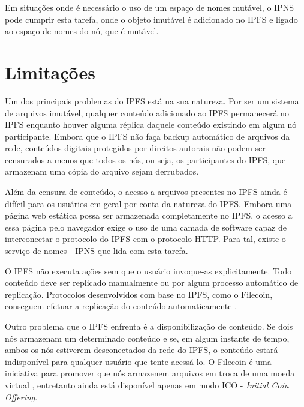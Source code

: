 \documentclass[tcc,capa]{texufpel}
\begin{document}
        Em situações onde é necessário o uso de um espaço de nomes mutável, o IPNS pode cumprir esta tarefa, onde o objeto imutável é adicionado no IPFS e ligado ao espaço de nomes do nó, que é mutável. 
        
    
    \section{Limitações}
    
    Um dos principais problemas do IPFS está na sua natureza. Por ser um sistema de arquivos imutável, qualquer conteúdo adicionado ao IPFS permanecerá no IPFS enquanto houver alguma réplica daquele conteúdo existindo em algum nó participante. Embora que o IPFS não faça backup automático de arquivos da rede, conteúdos digitais protegidos por direitos autorais não podem ser censurados a menos que todos os nós, ou seja, os participantes do IPFS, que armazenam uma cópia do arquivo sejam derrubados.
    
    Além da censura de conteúdo, o acesso a arquivos presentes no IPFS ainda é difícil para os usuários em geral por conta da natureza do IPFS. Embora uma página web estática possa ser armazenada completamente no IPFS, o acesso a essa página pelo navegador exige o uso de uma camada de software capaz de interconectar o protocolo do IPFS com o protocolo HTTP. Para tal, existe o serviço de nomes - IPNS que lida com esta tarefa.
    
    O IPFS não executa ações sem que o usuário invoque-as explicitamente. Todo conteúdo deve ser replicado manualmente ou por algum processo automático de replicação. Protocolos desenvolvidos com base no IPFS, como o Filecoin, conseguem efetuar a replicação do conteúdo automaticamente \cite{jbenet47issue}.
    
    Outro problema que o IPFS enfrenta é a disponibilização de conteúdo. Se dois nós armazenam um determinado conteúdo e se, em algum instante de tempo, ambos os nós estiverem desconectados da rede do IPFS, o conteúdo estará indisponível para qualquer usuário que tente acessá-lo. O Filecoin é uma iniciativa para promover que nós armazenem arquivos em troca de uma moeda virtual \cite{protocollabs}, entretanto ainda está disponível apenas em modo ICO - \textit{Initial Coin Offering}.
        

\end{document}
